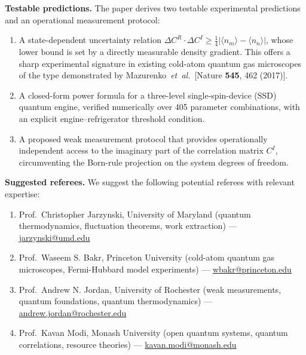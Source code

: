 \documentclass[aps,pra,preprint]{revtex4-2}
\begin{document}
\vspace{1em}

\noindent
\textbf{Testable predictions.}
The paper derives two testable experimental predictions and an
operational measurement protocol:

\begin{enumerate}
  \item[(A)] A state-dependent uncertainty relation
    $\Delta C^R \cdot \Delta C^I \ge \frac{1}{4}|\langle n_m\rangle -
    \langle n_n\rangle|$, whose lower bound is set by a directly
    measurable density gradient. This offers a sharp experimental
    signature in existing cold-atom quantum gas microscopes of the
    type demonstrated by Mazurenko~\textit{et~al.}~[Nature
    \textbf{545}, 462 (2017)].
  \item[(B)] A closed-form power formula for a three-level
    single-spin-device (SSD) quantum engine, verified numerically
    over 405 parameter combinations, with an explicit engine--refrigerator
    threshold condition.
  \item[(C)] A proposed weak measurement protocol that provides
    operationally independent access to the imaginary part of the
    correlation matrix $C^I$, circumventing the Born-rule projection
    on the system degrees of freedom.
\end{enumerate}

\vspace{1em}

\noindent
\textbf{Suggested referees.}
We suggest the following potential referees with relevant expertise:

\begin{enumerate}
  \item Prof.\ Christopher Jarzynski, University of Maryland
    (quantum thermodynamics, fluctuation theorems, work extraction)
    --- \href{mailto:jarzynski@umd.edu}{jarzynski@umd.edu}
  \item Prof.\ Waseem S. Bakr, Princeton University
    (cold-atom quantum gas microscopes, Fermi-Hubbard model experiments)
    --- \href{mailto:wbakr@princeton.edu}{wbakr@princeton.edu}
  \item Prof.\ Andrew N. Jordan, University of Rochester
    (weak measurements, quantum foundations, quantum thermodynamics)
    --- \href{mailto:andrew.jordan@rochester.edu}{andrew.jordan@rochester.edu}
  \item Prof.\ Kavan Modi, Monash University
    (open quantum systems, quantum correlations, resource theories)
    --- \href{mailto:kavan.modi@monash.edu}{kavan.modi@monash.edu}
\end{enumerate}
\end{document}
